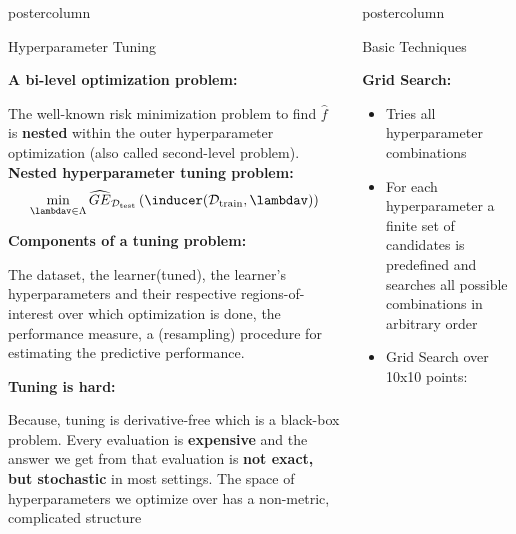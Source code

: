 \documentclass{beamer}
\newlength{\columnheight} %
\begin{document}
\begin{frame}[fragile]{}
\begin{columns}
\begin{column}{.31\textwidth}
\begin{beamercolorbox}[center]{postercolumn}
\begin{minipage}{.98\textwidth}
{\begin{myblock}{Hyperparameter Tuning}
\begin{codebox}
\textbf{A bi-level optimization problem:}
\end{codebox}
The well-known risk minimization problem to find $\hat f$ is \textbf{nested} within the outer hyperparameter optimization (also called second-level problem). \textbf{Nested hyperparameter tuning problem:}
$$ \min_{\lambdav \in \Lambda} \GEh{\Dtest}\left(\inducer(\Dtrain, \lambdav)\right) $$
  
  \begin{codebox}
\textbf{Components of a tuning problem:}
\end{codebox}
The dataset, the learner(tuned), the learner’s hyperparameters and their respective regions-of-interest over which optimization is done, the performance measure, a (resampling) procedure for estimating the predictive performance.

\begin{codebox}
\textbf{Tuning is hard:}
\end{codebox}

Because, tuning is derivative-free which is a black-box problem. Every evaluation is \textbf{expensive} and the answer we get from that evaluation is \textbf{not exact, but stochastic} in most settings. The space of hyperparameters we optimize over has a non-metric, complicated structure
\end{myblock}\vfill
						
				}
			\end{minipage}
		\end{beamercolorbox}
	\end{column}

\begin{column}{.31\textwidth}
\begin{beamercolorbox}[center]{postercolumn}
\begin{minipage}{.98\textwidth}
\parbox[t][\columnheight]{\textwidth}{
  
  \begin{myblock}{Basic Techniques}
  
  \begin{codebox}
  \textbf{Grid Search:}
  \end{codebox}
  
  \begin{itemize}[$\bullet$]     
  \setlength{\itemindent}{+.3in}
  \item Tries all hyperparameter combinations
  \item For each hyperparameter a finite set of candidates is predefined and searches all possible combinations in arbitrary order
  \item Grid Search over 10x10 points:
    \end{itemize}
  

\end{myblock}}
\end{minipage}
\end{beamercolorbox}
\end{column}
\end{columns}
\end{frame}
\end{document}

